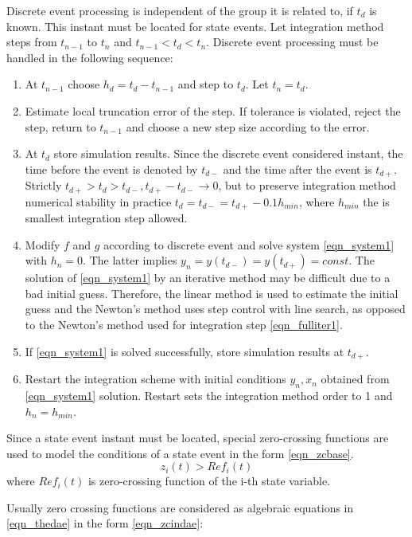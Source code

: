 \documentclass[lettersize,journal]{IEEEtran}
\begin{document}
Discrete event processing is independent of the group it is related to, if \(t_d\) is known. This instant must be located for state events. Let integration method steps from \(t_{n-1}\) to \(t_n\) and \(t_{n-1}<t_d<t_n\). Discrete event processing must be handled in the following sequence:
\begin{enumerate}
	\item At \(t_{n-1}\) choose \(h_d=t_d-t_{n-1}\) and step to \(t_d\). Let \(t_n=t_d\).
	\item Estimate local truncation error of the step. If tolerance is violated, reject the step, return to \(t_{n-1}\) and choose a new step size according to the error.
	\item At \(t_d\) store simulation results. Since the discrete event considered instant, the time before the event is denoted by \(t_{d-}\) and the time after the event is \(t_{d+}\). Strictly \(t_{d+}>t_d>t_{d-},  t_{d+}-t_{d-} \rightarrow 0\), but to preserve integration method numerical stability in practice \(t_d=t_{d-} = t_{d+}-0.1h_{min}\), where \(h_{min}\) the is smallest integration step allowed.
	\item Modify \(f\) and \(g\) according to discrete event and solve system \eqref{eqn_system1} with \(h_n=0\). The latter implies \(y_n=y(t_{d-})=y(t_{d+})=const\). The solution of \eqref{eqn_system1}  by an iterative method may be difficult due to a bad initial guess. Therefore, the linear method is used to estimate the initial guess and the Newton's method uses step control with line search, as opposed to the Newton's method used for integration step \eqref{eqn_fulliter1}.
	\item If \eqref{eqn_system1} is solved successfully, store simulation results at \(t_{d+}\).
	\item Restart the integration scheme with initial conditions \(y_n, x_n\) obtained from \eqref{eqn_system1} solution. Restart sets the integration method order to 1 and \(h_n=h_{min}\).
\end{enumerate}
Since a state event instant must be located, special zero-crossing functions are used to model the conditions of a state event in the form \eqref{eqn_zcbase}.
\begin{equation}
	\label{eqn_zcbase}
	z_i(t) > Ref_i(t)
\end{equation}
\noindent where \(Ref_i(t)\) is zero-crossing function of the i-th state variable.

Usually zero crossing functions are considered as algebraic equations in \eqref{eqn_thedae} in the form \eqref{eqn_zcindae}:
\end{document}
